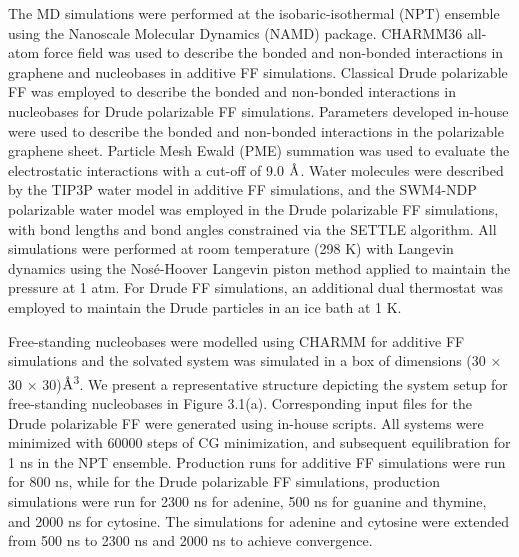 The MD simulations were performed at the isobaric-isothermal (NPT) ensemble using the Nanoscale Molecular Dynamics (NAMD) package.\supercite{phillips_scalable_2005} CHARMM36 all-atom force field was used to describe the bonded and non-bonded interactions in graphene and nucleobases in additive FF simulations. Classical Drude polarizable FF was employed to describe the bonded and non-bonded interactions in nucleobases for Drude polarizable FF simulations. Parameters developed in-house were used to describe the bonded and non-bonded interactions in the polarizable graphene sheet. Particle Mesh Ewald (PME)\supercite{darden_particle_1993} summation was used to evaluate the electrostatic interactions with a cut-off of 9.0 $\text{\normalfont\AA}$. Water molecules were described by the TIP3P\supercite{jorgensen_comparison_1983} water model in additive FF simulations, and the SWM4-NDP\supercite{lamoureux_polarizable_2006} polarizable water model was employed in the Drude polarizable FF simulations, with bond lengths and bond angles constrained via the SETTLE algorithm.\supercite{miyamoto_settle_1992} All simulations were performed at room temperature (298 K) with Langevin dynamics using the Nos\'{e}-Hoover Langevin piston method applied to maintain the pressure at 1 atm. For Drude FF simulations, an additional dual thermostat was employed to maintain the Drude particles in an ice bath at 1 K.

Free-standing nucleobases were modelled using CHARMM for additive FF simulations and the solvated system was simulated in a box of dimensions (30 × 30 × 30)$\text{\normalfont\AA}$\textsuperscript{3}. We present a representative structure depicting the system setup for free-standing nucleobases in Figure 3.1(a).  Corresponding input files for the Drude polarizable FF were generated using in-house scripts. All systems were minimized with 60000 steps of CG minimization, and subsequent equilibration for 1 ns in the NPT ensemble. Production runs for additive FF simulations were run for 800 ns, while for the Drude polarizable FF simulations, production simulations were run for 2300 ns for adenine, 500 ns for guanine and thymine, and 2000 ns for cytosine. The simulations for adenine and cytosine were extended from 500 ns to 2300 ns and 2000 ns to achieve convergence.

